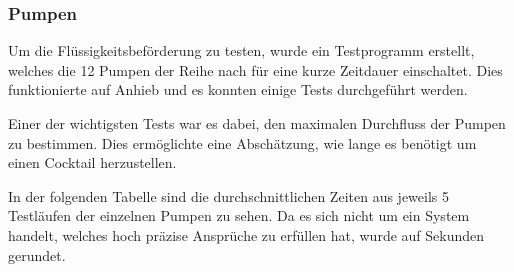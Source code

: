 \subsubsection{Pumpen}
\label{subsubsec:Inbetriebnahme_Pumpen}

Um die Flüssigkeitsbeförderung zu testen, wurde ein Testprogramm erstellt, welches die 12 Pumpen der Reihe nach für eine kurze Zeitdauer einschaltet. Dies funktionierte auf Anhieb und es konnten einige Tests durchgeführt werden. 

Einer der wichtigsten Tests war es dabei, den maximalen Durchfluss der Pumpen zu bestimmen. Dies ermöglichte eine Abschätzung, wie lange es benötigt um einen Cocktail herzustellen. 

In der folgenden Tabelle sind die durchschnittlichen Zeiten aus jeweils 5 Testläufen der einzelnen Pumpen zu sehen. Da es sich nicht um ein System handelt, welches hoch präzise Ansprüche zu erfüllen hat, wurde auf Sekunden gerundet.

